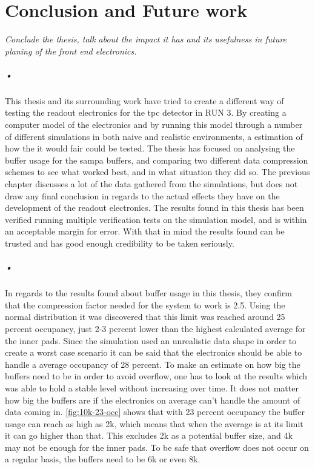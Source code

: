 \documentclass[a4paper, 12pt]{report}
\begin{document}
\chapter{Conclusion and Future work}
\textit{Conclude the thesis, talk about the impact it has and its usefulness in future planing of the front end electronics.}

\paragraph{•}
This thesis and its surrounding work have tried to create a different way of testing the readout electronics for the \gls{tpc} detector in RUN 3.
By creating a computer model of the electronics and by running this model through a number of different simulations in both naive and realistic environments, a estimation of how the it would fair could be tested.
The thesis has focused on analysing the buffer usage for the \gls{sampa} buffers, and comparing two different data compression schemes to see what worked best, and in what situation they did so.
The previous chapter discusses a lot of the data gathered from the simulations, but does not draw any final conclusion in regards to the actual effects they have on the development of the readout electronics.
The results found in this thesis has been verified running multiple verification tests on the simulation model, and is within an acceptable margin for error.
With that in mind the results found can be trusted and has good enough credibility to be taken seriously.

\paragraph{•}
In regards to the results found about buffer usage in this thesis, they confirm that the compression factor needed for the system to work is 2.5.
Using the normal distribution it was discovered that this limit was reached around 25 percent occupancy, just 2-3 percent lower than the highest calculated average for the inner pads.
Since the simulation used an unrealistic data shape in order to create a worst case scenario it can be said that the electronics should be able to handle a average occupancy of 28 percent.
To make an estimate on how big the buffers need to be in order to avoid overflow, one has to look at the results which was able to hold a stable level without increasing over time.
It does not matter how big the buffers are if the electronics on average can't handle the amount of data coming in.
\ref{fig:10k-23-occ} shows that with 23 percent occupancy the buffer usage can reach as high as 2k, which means that when the average is at its limit it can go higher than that.
This excludes 2k as a potential buffer size, and 4k may not be enough for the inner pads.
To be safe that overflow does not occur on a regular basis, the buffers need to be 6k or even 8k.
\end{document}
